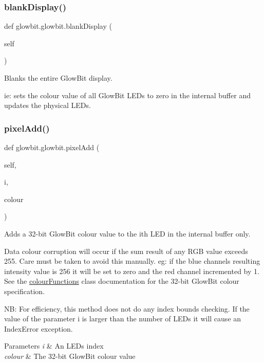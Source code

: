 \subsubsection{\texorpdfstring{blank\+Display()}{blankDisplay()}}
{\footnotesize\ttfamily def glowbit.\+glowbit.\+blank\+Display (\begin{DoxyParamCaption}\item[{}]{self }\end{DoxyParamCaption})}



Blanks the entire Glow\+Bit display. 

ie\+: sets the colour value of all Glow\+Bit L\+E\+Ds to zero in the internal buffer and updates the physical L\+E\+Ds. \mbox{\label{classglowbit_1_1glowbit_a8bb7ba36b4b7746f215ebad1acc0f5e2}} 
\subsubsection{\texorpdfstring{pixel\+Add()}{pixelAdd()}}
{\footnotesize\ttfamily def glowbit.\+glowbit.\+pixel\+Add (\begin{DoxyParamCaption}\item[{}]{self,  }\item[{}]{i,  }\item[{}]{colour }\end{DoxyParamCaption})}



Adds a 32-\/bit Glow\+Bit colour value to the i\textquotesingle{}th L\+ED in the internal buffer only. 

Data colour corruption will occur if the sum result of any R\+GB value exceeds 255. Care must be taken to avoid this manually. eg\+: if the blue channel\textquotesingle{}s resulting intensity value is 256 it will be set to zero and the red channel incremented by 1. See the \hyperlink{classglowbit_1_1colourFunctions}{colour\+Functions} class documentation for the 32-\/bit Glow\+Bit colour specification.

NB\+: For efficiency, this method does not do any index bounds checking. If the value of the parameter i is larger than the number of L\+E\+Ds it will cause an Index\+Error exception.


\begin{DoxyParams}{Parameters}
{\em i} & An L\+ED\textquotesingle{}s index \\
\hline
{\em colour} & The 32-\/bit Glow\+Bit colour value \\
\hline
\end{DoxyParams}
\mbox{\label{classglowbit_1_1glowbit_a6184de87721652f9f55f9301f6a3a9ce}} 
